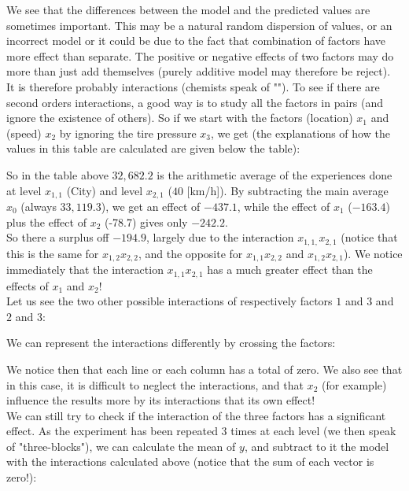 	We see that the differences between the model and the predicted values are sometimes important. This may be a natural random dispersion of values, or an incorrect model or it could be due to the fact that combination of factors have more effect than separate. The positive or negative effects of two factors may do more than just add themselves (purely additive model may therefore be reject).\\
		
	It is therefore probably interactions (chemists speak of ""). To see if there are second orders interactions, a good way is to study all the factors in pairs (and ignore the existence of others). So if we start with the factors (location) $x_1$ and (speed) $x_2$ by ignoring the tire pressure $x_3$, we get (the explanations of how the values in this table are calculated are given below the table):
	
	So in the table above $32,682.2$ is the arithmetic average of the experiences done at level $x_{1,1}$ (City) and level $x_{2,1}$ ($40$ [km/h]). By subtracting the main average $x_0$ (always $33,119.3$), we get an effect of $-437.1$, while the effect of $x_1$ ($-163.4$) plus the effect of $x_2$ (-78.7) gives only $-242.2$.\\

	So there a surplus off $-194.9$, largely due to the interaction $x_{1,1,}x_{2,1}$ (notice that this is the same for $x_{1,2}x_{2,2}$, and the opposite for $x_{1,1}x_{2,2}$ and $x_{1,2}x_{2,1}$). We notice immediately that the interaction  $x_{1,1}x_{2,1}$ has a much greater effect than the effects of $x_1$ and $x_2$!\\

	Let us see the two other possible interactions of respectively factors $1$ and $3$ and $2$ and $3$:
		
	
	We can represent the interactions differently by crossing the factors:
	
	
		       
	We notice then that each line or each column has a total of zero. We also see that in this case, it is difficult to neglect the interactions, and that $x_2$ (for example) influence the results more by its interactions that its own effect!\\

	We can still try to check if the interaction of the three factors has a significant effect. As the experiment has been repeated $3$ times at each level (we then speak of "three-blocks"), we can calculate the mean of $y$, and subtract to it the model with the interactions calculated above (notice that the sum of each vector is zero!):
	
